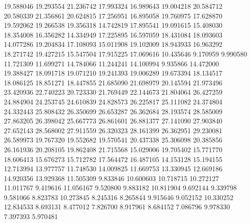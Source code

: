 19.588046
19.293554
21.236742
17.993324
16.989643
19.004218
20.584712
20.580339
21.356861
20.624815
17.256951
16.895058
19.760975
17.628870
19.592062
19.266538
19.356318
14.742819
17.895541
19.091615
15.408030
18.354008
16.356282
14.334949
17.225895
16.597059
18.431084
18.093603
14.077286
19.204834
17.108093
15.011908
19.102009
18.943933
16.963292
18.271742
19.427215
15.547504
17.915225
17.069616
10.435646
9.170959
9.990580
11.721309
11.699271
14.784066
11.244241
14.100994
9.935866
14.472000
19.388427
18.091718
19.071210
19.241393
19.006289
19.673394
18.134517
18.086125
18.851271
18.447855
21.685090
21.698979
20.145594
21.973496
23.420936
22.740223
20.723330
21.769449
22.144673
21.804064
26.427259
24.884904
24.253745
24.610839
24.828573
26.225817
25.111082
24.374804
24.332443
25.808432
26.350699
26.653287
26.362684
28.193574
28.585009
27.863205
26.398042
25.667773
26.861601
26.881377
27.141090
27.903840
27.652143
28.568002
27.911559
26.320323
28.161399
26.362951
29.230081
26.589973
19.767320
19.552682
19.570541
20.437338
25.306098
20.385856
26.161936
20.208105
19.862408
21.715568
15.029006
19.705402
15.771770
18.606413
15.676273
15.712782
17.564472
16.487105
14.153128
15.194155
12.713994
13.977757
11.748530
14.009825
11.669753
13.330945
12.669186
14.920356
13.929368
11.505309
9.833846
10.600603
10.718715
10.272127
11.011767
9.419616
11.056167
9.520800
9.883182
10.811904
9.692144
9.339798
9.581066
8.823783
10.273845
8.245316
8.265844
9.915646
9.052152
10.330252
12.834533
8.693131
8.477012
7.826700
8.917961
8.684152
7.086796
9.978330
7.397393
5.970481
